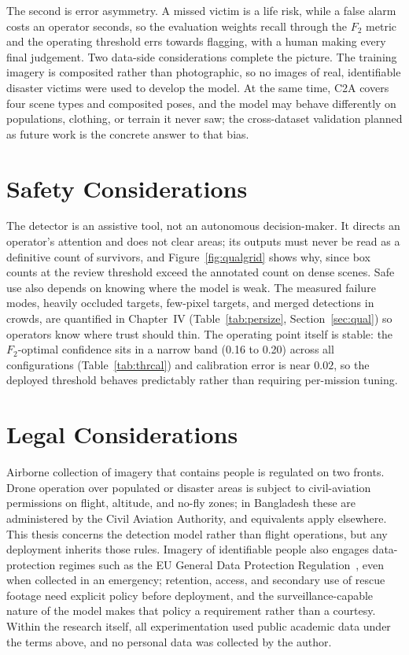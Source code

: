 The second is error asymmetry. A missed victim is a life risk, while a false
alarm costs an operator seconds, so the evaluation weights recall through the
$F_2$ metric and the operating threshold errs towards flagging, with a human
making every final judgement. Two data-side considerations complete the
picture. The training imagery is composited rather than photographic, so no
images of real, identifiable disaster victims were used to develop the model.
At the same time, C2A covers four scene types and composited poses, and the
model may behave differently on populations, clothing, or terrain it never
saw; the cross-dataset validation planned as future work is the concrete
answer to that bias.

\section{Safety Considerations}
The detector is an assistive tool, not an autonomous decision-maker. It
directs an operator's attention and does not clear areas; its outputs must
never be read as a definitive count of survivors, and
Figure~\ref{fig:qualgrid} shows why, since box counts at the review threshold
exceed the annotated count on dense scenes. Safe use also depends on knowing
where the model is weak. The measured failure modes, heavily occluded
targets, few-pixel targets, and merged detections in crowds, are quantified
in Chapter~IV (Table~\ref{tab:persize}, Section~\ref{sec:qual}) so operators
know where trust should thin. The operating point itself is stable: the
$F_2$-optimal confidence sits in a narrow band (0.16 to 0.20) across all
configurations (Table~\ref{tab:thrcal}) and calibration error is near
$0.02$, so the deployed threshold behaves predictably rather than requiring
per-mission tuning.

\section{Legal Considerations}
\label{sec:legal5}
Airborne collection of imagery that contains people is regulated on two
fronts. Drone operation over populated or disaster areas is subject to
civil-aviation permissions on flight, altitude, and no-fly zones; in
Bangladesh these are administered by the Civil Aviation Authority, and
equivalents apply elsewhere. This thesis concerns the detection model rather
than flight operations, but any deployment inherits those rules. Imagery of
identifiable people also engages data-protection regimes such as the EU
General Data Protection Regulation~\cite{gdpr2016}, even when collected in
an emergency; retention, access, and secondary use of rescue footage need
explicit policy before deployment, and the surveillance-capable nature of
the model makes that policy a requirement rather than a courtesy. Within the
research itself, all experimentation used public academic data under the
terms above, and no personal data was collected by the author.

